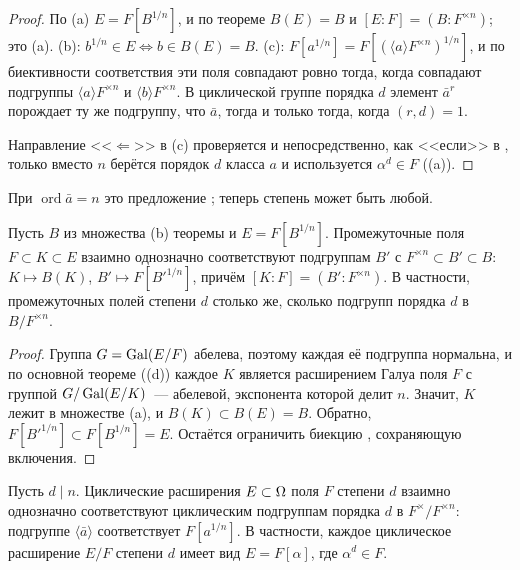 \begin{proof}
По (a) $E=F[B^{1/n}]$, и по теореме  $B(E)=B$ и $[E:F]=(B:F^{\times n})$; это (a). (b): $b^{1/n}\in E\iff b\in
B(E)=B$. (c): $F[a^{1/n}]=F[(\langle a\rangle F^{\times n})^{1/n}]$, и по биективности соответствия эти поля совпадают ровно
тогда, когда совпадают подгруппы $\langle a\rangle F^{\times n}$ и $\langle b\rangle F^{\times n}$. В циклической группе
порядка $d$ элемент $\bar a^r$ порождает ту же подгруппу, что $\bar a$, тогда и только тогда, когда $(r,d)=1$.

Направление <<$\Leftarrow$>> в (c) проверяется и непосредственно, как <<если>> в , только вместо $n$ берётся
порядок $d$ класса $a$ и используется $\alpha^d\in F$ ((a)).
\end{proof}

При $\operatorname{ord}\bar a=n$ это предложение ; теперь степень может быть любой.

\begin{corollary}
Пусть $B$ из множества \textup{(b)} теоремы  и $E=F[B^{1/n}]$. Промежуточные поля $F\subset K\subset E$ взаимно
однозначно соответствуют подгруппам $B'$ с $F^{\times n}\subset B'\subset B$: $K\mapsto B(K)$, $B'\mapsto F[B'^{1/n}]$,
причём $[K:F]=(B':F^{\times n})$. В частности, промежуточных полей степени $d$ столько же, сколько подгрупп порядка $d$ в
$B/F^{\times n}$.
\end{corollary}

\begin{proof}
Группа $G=\operatorname{Gal}(E/F)$ абелева, поэтому каждая её подгруппа нормальна, и по основной теореме ((d)) каждое $K$ является
расширением Галуа поля $F$ с группой $G/\operatorname{Gal}(E/K)$~--- абелевой, экспонента которой делит $n$. Значит, $K$ лежит в
множестве (a), и $B(K)\subset B(E)=B$. Обратно, $F[B'^{1/n}]\subset F[B^{1/n}]=E$. Остаётся ограничить биекцию ,
сохраняющую включения.
\end{proof}

\begin{corollary}
Пусть $d\mid n$. Циклические расширения $E\subset\Omega$ поля $F$ степени $d$ взаимно однозначно соответствуют циклическим
подгруппам порядка $d$ в $F^\times/F^{\times n}$: подгруппе $\langle\bar a\rangle$ соответствует $F[a^{1/n}]$. В
частности, каждое циклическое расширение $E/F$ степени $d$ имеет вид $E=F[\alpha]$, где $\alpha^d\in F$.
\end{corollary}


